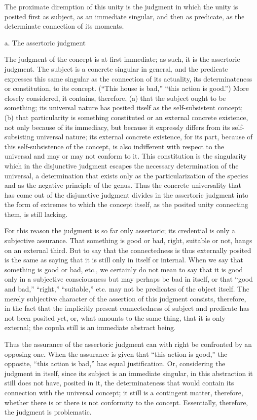 The proximate diremption of this unity is
the judgment in which the unity is posited
first as subject,
as an immediate singular,
and then as predicate,
as the determinate connection of its moments.

a. The assertoric judgment

The judgment of the concept is at first immediate;
as such, it is the assertoric judgment.
The subject is a concrete singular in general,
and the predicate expresses this same singular
as the connection of its actuality,
its determinateness or constitution,
to its concept.
(“This house is bad,” “this action is good.”)
More closely considered, it contains, therefore,
(a) that the subject ought to be something;
its universal nature has posited itself as
the self-subsistent concept;
(b) that particularity is something constituted
or an external concrete existence,
not only because of its immediacy,
but because it expressly differs
from its self-subsisting universal nature;
its external concrete existence, for its part,
because of this self-subsistence of the concept,
is also indifferent with respect to the universal
and may or may not conform to it.
This constitution is the singularity
which in the disjunctive judgment escapes
the necessary determination of the universal,
a determination that exists only as
the particularization of the species
and as the negative principle of the genus.
Thus the concrete universality that has come out of
the disjunctive judgment divides in the assertoric judgment
into the form of extremes to which the concept itself,
as the posited unity connecting them, is still lacking.

For this reason the judgment is so far only assertoric;
its credential is only a subjective assurance.
That something is good or bad, right, suitable or not,
hangs on an external third.
But to say that the connectedness is
thus externally posited  is the same as
saying that it is still only in itself or internal.
When we say that something is good or bad, etc.,
we certainly do not mean to say that it is good
only in a subjective consciousness
but may perhaps be bad in itself,
or that “good and bad,” “right,” “suitable,” etc.
may not be predicates of the object itself.
The merely subjective character of
the assertion of this judgment consists,
therefore, in the fact that the implicitly
present connectedness of subject and predicate
has not been posited yet,
or, what amounts to the same thing,
that it is only external;
the copula still is an immediate abstract being.

Thus the assurance of the assertoric judgment can
with right be confronted by an opposing one.
When the assurance is given that
“this action is good,”
the opposite,
“this action is bad,”
has equal justification.
Or, considering the judgment in itself,
since its subject is an immediate singular,
in this abstraction it still does not have,
posited in it, the determinateness
that would contain its connection
with the universal concept;
it still is a contingent matter, therefore,
whether there is or there is not conformity to the concept.
Essentially, therefore, the judgment is problematic.


